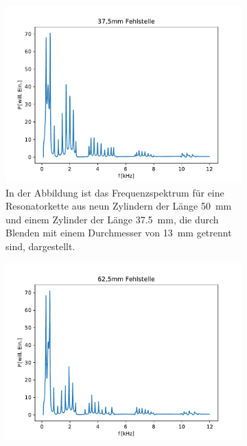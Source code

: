             \begin{figure}[ht]
                \centering
                \begin{subfigure}[b]{0.45\textwidth}
                    \centering
                    \includegraphics[scale=0.45]{./pictures/1dim_10_Zylinder_375_Fehlstelle.pdf}
                    \caption{In der Abbildung ist das Frequenzspektrum für eine Resonatorkette aus neun Zylindern der Länge \SI{50}{\milli\metre} und einem Zylinder der Länge \SI{37.5}{\milli\metre}, die durch Blenden mit einem Durchmesser von \SI{13}{\milli\metre} getrennt sind, dargestellt.}
                    \label{fig:1dim_10_Zylinder_375_Fehlstelle}
                \end{subfigure}
                \hfill
                \centering
                \begin{subfigure}[b]{0.45\textwidth}
                    \centering
                    \includegraphics[scale=0.45]{./pictures/1dim_4_Zylinder_625_Fehlstelle.pdf}

\end{subfigure}
\end{figure}
